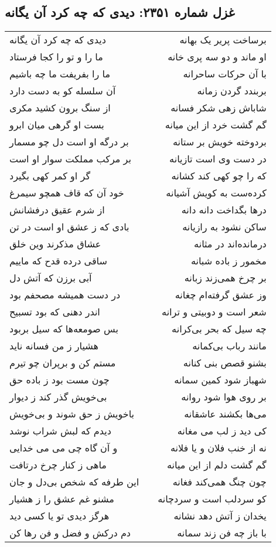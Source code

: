 \begin{center}
\section*{غزل شماره ۲۳۵۱: دیدی که چه کرد آن یگانه}
\label{sec:2351}
\begin{longtable}{l p{0.5cm} r}
دیدی که چه کرد آن یگانه
&&
برساخت پریر یک بهانه
\\
ما را و تو را کجا فرستاد
&&
او ماند و دو سه پری خانه
\\
ما را بفریفت ما چه باشیم
&&
با آن حرکات ساحرانه
\\
آن سلسله کو به دست دارد
&&
بربندد گردن زمانه
\\
از سنگ برون کشید مکری
&&
شاباش زهی شکر فسانه
\\
بست او گرهی میان ابرو
&&
گم گشت خرد از این میانه
\\
بر درگه او است دل چو مسمار
&&
بردوخته خویش بر ستانه
\\
بر مرکب مملکت سوار او است
&&
در دست وی است تازیانه
\\
گر او کمر کهی بگیرد
&&
که را چو کهی کند کشانه
\\
خود آن که قاف همچو سیمرغ
&&
کرده‌ست به کویش آشیانه
\\
از شرم عقیق درفشانش
&&
درها بگداخت دانه دانه
\\
بادی که ز عشق او است در تن
&&
ساکن نشود به رازیانه
\\
عشاق مذکرند وین خلق
&&
درمانده‌اند در مثانه
\\
ساقی درده قدح که ماییم
&&
مخمور ز باده شبانه
\\
آبی برزن که آتش دل
&&
بر چرخ همی‌زند زبانه
\\
در دست همیشه مصحفم بود
&&
وز عشق گرفته‌ام چغانه
\\
اندر دهنی که بود تسبیح
&&
شعر است و دوبیتی و ترانه
\\
بس صومعه‌ها که سیل بربود
&&
چه سیل که بحر بی‌کرانه
\\
هشیار ز من فسانه ناید
&&
مانند رباب بی‌کمانه
\\
مستم کن و برپران چو تیرم
&&
بشنو قصص بنی کنانه
\\
چون مست بود ز باده حق
&&
شهباز شود کمین سمانه
\\
بی‌خویش گذر کند ز دیوار
&&
بر روی هوا شود روانه
\\
باخویش ز حق شوند و بی‌خویش
&&
می‌ها بکشند عاشقانه
\\
دیدم که لبش شراب نوشد
&&
کی دید ز لب می مغانه
\\
و آن گاه چی می می خدایی
&&
نه از خنب فلان و یا فلانه
\\
ماهی ز کنار چرخ درتافت
&&
گم گشت دلم از این میانه
\\
این طرفه که شخص بی‌دل و جان
&&
چون چنگ همی‌کند فغانه
\\
مشنو غم عشق را ز هشیار
&&
کو سردلب است و سردچانه
\\
هرگز دیدی تو یا کسی دید
&&
یخدان ز آتش دهد نشانه
\\
دم درکش و فضل و فن رها کن
&&
با باز چه فن زند سمانه
\\
\end{longtable}
\end{center}
